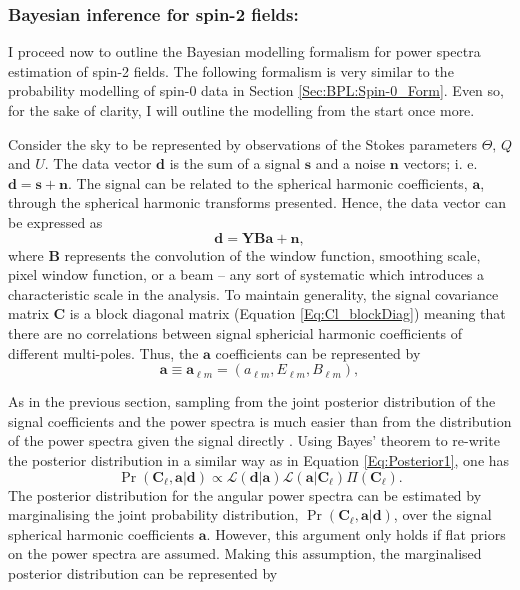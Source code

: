 \subsubsection{Bayesian inference for spin-2 fields:}
I proceed now to outline the Bayesian modelling formalism for power spectra estimation of spin-2 fields. The following formalism is very similar to the probability modelling of spin-0 data in Section %
\ref{Sec:BPL:Spin-0_Form}. Even so, for the sake of clarity, I will outline the modelling from the start once more. 

\qquad Consider the sky to be represented by observations of the Stokes parameters $\Theta,\, Q$ and $U$. The data vector $\mathbf{d}$ is the sum of a signal $\mathbf{s}$ and a noise $\mathbf{n}$ vectors; i. e. $\mathbf{d}=\mathbf{s}+\mathbf{n}$.  The signal can be related to the spherical harmonic coefficients, $\mathbf{a}$, through the spherical harmonic transforms presented. Hence, the data vector can be expressed as
\begin{equation}
\mathbf{d}=\mathbf{YBa}+\mathbf{n},
\end{equation}
\noindent where $\mathbf{B}$ represents the convolution of the window function, smoothing scale, pixel window function, or a beam -- any sort of systematic which introduces a characteristic scale in the analysis. To maintain generality, the signal covariance matrix $\mathbf{C}$ is a block diagonal matrix (Equation \ref{Eq:Cl_blockDiag}) meaning that there are no correlations between signal sphericial harmonic coefficients of different multi-poles. Thus, the $\bm{a}$ coefficients can be represented by
\begin{equation}
\mathbf{a} \equiv \mathbf{a}_{\ell m}=\left( a_{\ell m},E_{\ell m},B_{\ell m}\right),
\end{equation}

\qquad As in the previous section, sampling from the joint posterior distribution of the signal coefficients and the power spectra is much easier than from the distribution of the power spectra given the signal directly \citep{Wandelt2004,Larson2007,AlmostBlackPearl2016}. Using Bayes' theorem to re-write the posterior distribution in a similar way as in Equation \ref{Eq:Posterior1}, one has
\begin{equation}
\Pr(\mathbf{C}_{\ell},\mathbf{a}|\mathbf{d}) \propto\mathcal{L}(\mathbf{d}|\mathbf{a})\mathcal{L}(\mathbf{a}|\mathbf{C}_{\ell})\Pi(\mathbf{C}_{\ell}).
\label{Eq:FullPost}
\end{equation}
The posterior distribution for the angular power spectra can be estimated by marginalising the joint probability distribution, $\Pr(\mathbf{C}_{\ell },\mathbf{a}|\mathbf{d})$, over the signal spherical harmonic coefficients $\mathbf{a}$. However, this argument only holds if flat priors on the power spectra are assumed. Making this assumption, the marginalised posterior distribution can be represented by

